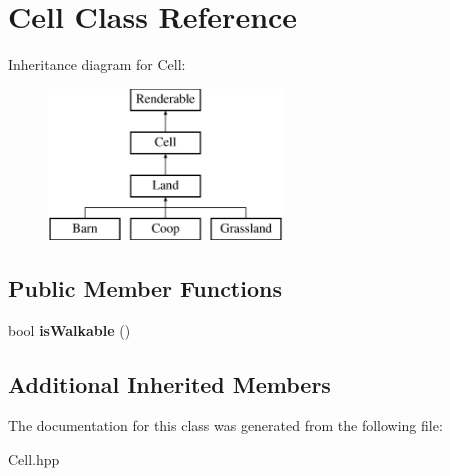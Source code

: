 \hypertarget{class_cell}{}\section{Cell Class Reference}
\label{class_cell}
Inheritance diagram for Cell\+:\begin{figure}[H]
\begin{center}
\leavevmode
\includegraphics[height=4.000000cm]{class_cell}
\end{center}
\end{figure}
\subsection*{Public Member Functions}
\begin{DoxyCompactItemize}
\item 
\mbox{\label{class_cell_af8625542ca100de4cc6e221ea131f05c}} 
bool {\bfseries is\+Walkable} ()
\end{DoxyCompactItemize}
\subsection*{Additional Inherited Members}


The documentation for this class was generated from the following file\+:\begin{DoxyCompactItemize}
\item 
Cell.\+hpp\end{DoxyCompactItemize}
